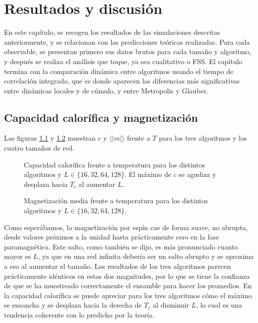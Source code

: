 \chapter{Resultados y discusión} \label{chap:resultados}
En este capítulo, se recogen los resultados de las simulaciones descritas anteriormente, y se relacionan con las predicciones teóricas realizadas. Para cada observable, se presentan primero sus datos brutos para cada tamaño y algoritmo, y después se realiza el análisis que toque, ya sea cualitativo o FSS. El capítulo termina con la comparación dinámica entre algoritmos usando el tiempo de correlación integrado, que es donde aparecen las diferencias más significativas entre dinámicas locales y de cúmulo, y entre Metropolis y Glauber.

\section{Capacidad calorífica y magnetización}

Las figuras \ref{fig:c} y \ref{fig:m} muestran $c$ y $\langle |m| \rangle$ frente a $T$ para los tres algoritmos y los cuatro tamaños de red.

\begin{figure}
  \centering
  
  \caption{Capacidad calorífica frente a temperatura para los distintos algoritmos y $L \in \{16, 32, 64, 128\}$. El máximo de $c$ se agudiza y desplaza hacia $T_c$ al aumentar $L$.}
  \label{fig:c}
\end{figure}
\begin{figure}
  \centering
  
  \caption{Magnetización media frente a temperatura para los distintos algoritmos y $L \in \{16, 32, 64, 128\}$.}
  \label{fig:m}
\end{figure}

Como esperábamos, la magnetización por espín cae de forma suave, no abrupta, desde valores próximos a la unidad hasta prácticamente cero en la fase paramagnética. Este salto, como también se dijo, es más pronunciado cuanto mayor es $L$, ya que en una red infinita debería ser un salto abrupto y se aproxima a eso al aumentar el tamaño. Los resultados de los tres algoritmos parecen prácticamente idénticos en estas dos magnitudes, por lo que se tiene la confianza de que se ha muestreado correctamente el ensamble para hacer los promedios. En la capacidad calorífica se puede apreciar para los tres algoritmos cómo el máximo se ensancha y se desplaza hacia la derecha de $T_c$ al disminuir $L$, lo cual es una tendencia coherente con lo predicho por la teoría.

